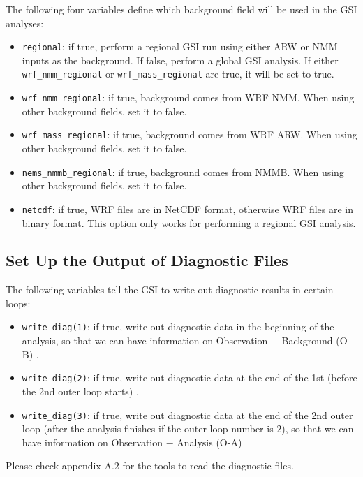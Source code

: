 The following four variables define which background field will be used in the GSI analyses:

\begin{itemize}
\item \verb|regional|: if true, perform a regional GSI run using either ARW or NMM inputs as the background. If false, perform a global GSI analysis. If either \verb|wrf_nmm_regional| or \verb|wrf_mass_regional| are true, it will be set to true.
\item \verb|wrf_nmm_regional|: if true, background comes from WRF NMM. When using other background fields, set it to false. 
\item \verb|wrf_mass_regional|: if true, background comes from WRF ARW. When using other background fields, set it to false. 
\item \verb|nems_nmmb_regional|: if true, background comes from NMMB. When using other background fields, set it to false.
\item \verb|netcdf|: if true, WRF files are in NetCDF format, otherwise WRF files are in binary format. This option only works for performing a regional GSI analysis.
\end{itemize}

\subsection{Set Up the Output of Diagnostic Files}

The following variables tell the GSI to write out diagnostic results in certain loops:

\begin{itemize}
\item \verb|write_diag(1)|: if true, write out diagnostic data in the beginning of the analysis, so that we can have information on Observation $-$ Background (O-B) .
\item \verb|write_diag(2)|: if true, write out diagnostic data at the end of the 1st (before the 2nd outer loop starts) .
\item \verb|write_diag(3)|: if true, write out diagnostic data at the end of the 2nd outer loop (after the analysis finishes if the outer loop number is 2), so that we can have information on Observation $-$ Analysis (O-A) 
\end{itemize}

Please check appendix A.2 for the tools to read the diagnostic files.

